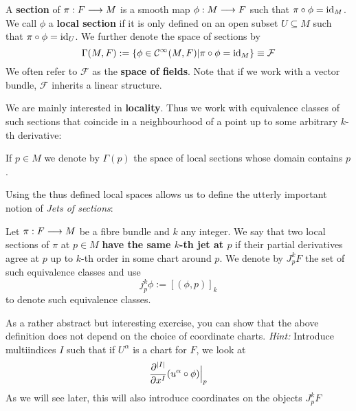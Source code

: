 \begin{definition}
  A \textbf{section} of $\pi:F \longrightarrow M$ is a smooth map $\phi: M \lra F$ such that $\pi \circ \phi = \id_M$. We call $\phi$ a \textbf{local section} if it is only defined on an open subset $U \subseteq M$ such that $\pi \circ \phi = \id_U$. We further denote the space of sections by $$\Gamma(M,F):= \{ \phi \in \Ci(M,F) | \pi \circ \phi = \id_M \} \equiv \mathcal{F}$$
  We often refer to $\mathcal{F}$ as the \textbf{space of fields}. Note that if we work with a vector bundle, $\mathcal{F}$ inherits a linear structure.
\end{definition}

We are mainly interested in \textbf{locality}. Thus we work with equivalence classes of such sections that coincide in a neighbourhood of a point up to some arbitrary $k$-th derivative:

\begin{definition}
  If $p \in M$ we denote by $\Gamma(p)$ the space of local sections whose domain contains $p$.
\end{definition}

Using the thus defined local spaces allows us to define the utterly important notion of \emph{Jets of sections}:

\begin{definition}
\label{def:Jets_sections}
Let $\pi:F\longrightarrow M$ be a fibre bundle and $k$ any integer. We say that two local sections of $\pi$ at $p \in M$ \textbf{have the same $k$-th jet at $p$} if their partial derivatives agree at $p$ up to $k$-th order in some chart around $p$. We denote by $J^k_p F$ the set of such equivalence classes and use
$$ j^k_p \phi := [(\phi, p)]_k $$
to denote such equivalence classes.
\end{definition}

\begin{rem}
As a rather abstract but interesting exercise, you can show that the above definition does not depend on the choice of coordinate charts. \emph{Hint:} Introduce multiindices $I$ such that if $U^\alpha$ is a chart for $F$, we look at
$$ \dell{^{|I|}}{x^I} (u^\alpha \circ \phi) \Big|_p $$
As we will see later, this will also introduce coordinates on the objects $J^k_p F$
\end{rem}


